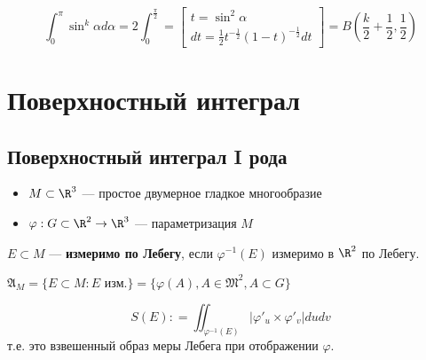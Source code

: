 \begin{example}
    \begin{equation}
        \int_0^\pi \sin^k \alpha d\alpha = 2 \int_0^{\frac{\pi}{2}} = \begin{bmatrix} t = \sin^2\alpha \\ dt = \frac{1}{2}t^{ - \frac{1}{2}} (1 - t)^{ - \frac{1}{2}} dt \end{bmatrix} = B\left( \frac{k}{2} + \frac{1}{2}, \frac{1}{2} \right) \label{интеграл синуса в степени}
    \end{equation}
\end{example}

\pagebreak

\section{Поверхностный интеграл}

\subsection{Поверхностный интеграл I рода}

\begin{definition}\itemfix
    \begin{itemize}
        \item \(M \subset \R^3\) --- простое двумерное гладкое многообразие
        \item \(\varphi : G \subset \R^2 \to \R^3\) --- параметризация \(M\)
    \end{itemize}

    \(E \subset M\) --- \textbf{измеримо по Лебегу}, если \(\varphi^{-1}(E)\) измеримо в \(\R^2\) по Лебегу.
\end{definition}

\begin{obozn}
    \(\mathfrak{A}_M = \{E \subset M : E \text{ изм.}\} = \{\varphi(A), A \in \mathfrak{M}^2, A \subset G\} \)
\end{obozn}

\begin{definition}
    \[S(E) : = \iint_{\varphi^{-1}(E)} |\varphi'_u \times \varphi'_v| du dv\]
    т.е. это взвешенный образ меры Лебега при отображении \(\varphi\).
\end{definition}

